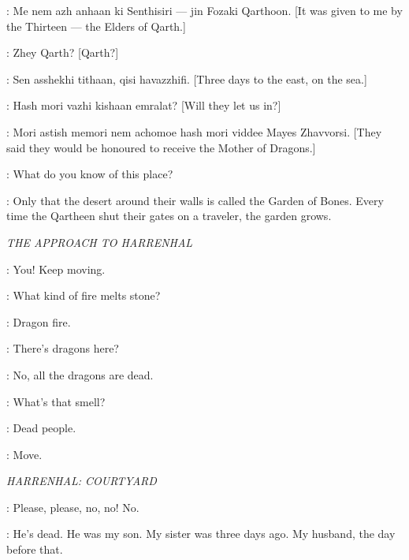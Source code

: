 \KOVARRO: Me nem azh anhaan ki Senthisiri --- jin Fozaki Qarthoon. [It was given to me by the Thirteen --- the Elders of Qarth.] 

\DAENERYS: Zhey Qarth? [Qarth?] 

\KOVARRO: Sen asshekhi tithaan, qisi havazzhifi. [Three days to the east, on the sea.] 

\DAENERYS: Hash mori vazhi kishaan emralat? [Will they let us in?] 

\KOVARRO: Mori astish memori nem achomoe hash mori viddee Mayes Zhavvorsi. [They said they would be honoured to receive the Mother of Dragons.] 


\DAENERYS: What do you know of this place? 

\JORAH: Only that the desert around their walls is called the Garden of Bones. Every time the Qartheen shut their gates on a traveler, the garden grows. 


\scene

\textit{THE APPROACH TO HARRENHAL} 


\GUARD: You! Keep moving. 

\GENDRY: What kind of fire melts stone? 

\ARYA: Dragon fire. 

\HOTPIE: There's dragons here? 

\GENDRY: No, all the dragons are dead. 

\HOTPIE: What's that smell? 

\ARYA: Dead people. 

\GUARD: Move. 



\scene

\textit{ HARRENHAL: COURTYARD}



\VICTIM: Please, please, no, no! No. 


\PEASANTWOMAN: He's dead. He was my son. My sister was three days ago. My husband, the day before that. 

